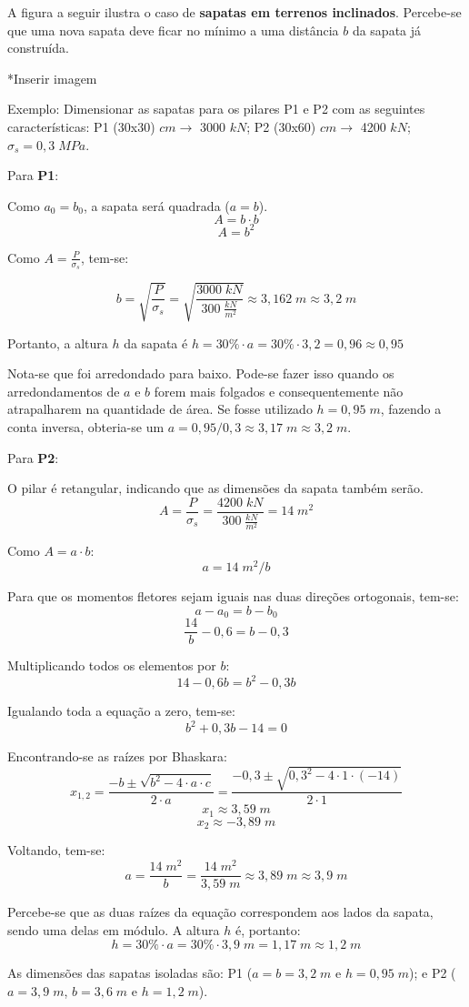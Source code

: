 A figura a seguir ilustra o caso de \textbf{sapatas em terrenos inclinados}. Percebe-se que uma nova sapata deve ficar no mínimo a uma distância $b$ da sapata já construída.

*Inserir imagem

Exemplo: Dimensionar as sapatas para os pilares P1 e P2 com as seguintes características:
P1 (30x30) $cm\rightarrow$ 3000 $kN$; P2 (30x60) $cm\rightarrow$ 4200 $kN$; $\sigma_s=0,3\;MPa$.

Para \textbf{P1}:

Como $a_0=b_0$, a sapata será quadrada ($a=b$). $$A=b\cdot b$$ $$A=b^2$$

Como $A=\frac{P}{\sigma_s}$, tem-se:

$$b=\sqrt{\frac{P}{\sigma_s}}=\sqrt{\frac{3000\;kN}{300\;\frac{kN}{m^2}}}\approx3,162\;m\approx3,2\;m$$

Portanto, a altura $h$ da sapata é $h=30\%\cdot a=30\%\cdot 3,2=0,96\approx0,95$

Nota-se que foi arredondado para baixo. Pode-se fazer isso quando os arredondamentos de $a$ e $b$ forem mais folgados e consequentemente não atrapalharem na quantidade de área. Se fosse utilizado $h=0,95\;m$, fazendo a conta inversa, obteria-se um $a=0,95/0,3\approx3,17\;m\approx3,2\;m$.

Para \textbf{P2}:

O pilar é retangular, indicando que as dimensões da sapata também serão.
$$A=\frac{P}{\sigma_s}=\frac{4200\;kN}{300\;\frac{kN}{m^2}}=14\;m^2$$

Como $A=a\cdot b$:
$$a=14\;m^2/b$$

Para que os momentos fletores sejam iguais nas duas direções ortogonais, tem-se:
$$a-a_0=b-b_0$$
$$\frac{14}{b}-0,6=b-0,3$$

Multiplicando todos os elementos por $b$:
$$14-0,6b=b^2-0,3b$$

Igualando toda a equação a zero, tem-se:
$$b^2+0,3b-14=0$$

Encontrando-se as raízes por Bhaskara:
$$x_{1, 2}=\frac{-b\pm\sqrt{b^2-4\cdot a\cdot c}}{2\cdot a}=\frac{-0,3\pm\sqrt{0,3^2-4\cdot 1\cdot (-14)}}{2\cdot1}$$
$$x_1\approx3,59\;m$$
$$x_2\approx-3,89\;m$$

Voltando, tem-se:
$$a=\frac{14\;m^2}{b}=\frac{14\;m^2}{3,59\;m}\approx3,89\;m\approx3,9\;m$$

Percebe-se que as duas raízes da equação correspondem aos lados da sapata, sendo uma delas em módulo. A altura $h$ é, portanto:
$$h=30\%\cdot a=30\%\cdot 3,9\;m=1,17\;m\approx1,2\;m$$

As dimensões das sapatas isoladas são: P1 ($a=b=3,2\;m$ e $h=0,95\;m$); e P2 ($a=3,9\;m$, $b=3,6\;m$ e $h=1,2\;m$).